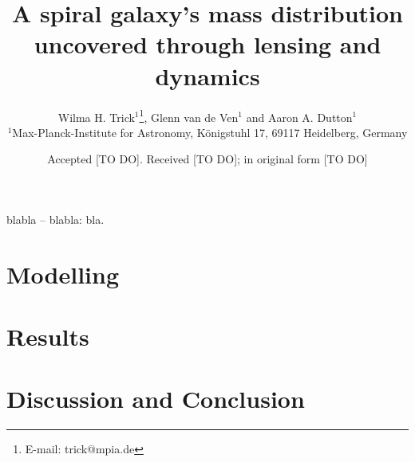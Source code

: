 \documentclass[useAMS,usenatbib]{mn2e}
\title[A spiral galaxy's mass distribution uncovered]{A spiral galaxy's mass distribution uncovered through lensing and dynamics}
\author[W. H. Trick, G. van de Ven and A. A. Dutton]{Wilma H. Trick$^{1}$\thanks{E-mail:
trick@mpia.de}, Glenn van de Ven$^{1}$ and Aaron A. Dutton$^{1}$\\
$^{1}$Max-Planck-Institute for Astronomy, K\"{o}nigstuhl 17, 69117 Heidelberg, Germany}
\begin{document}
\date{Accepted [TO DO]. Received [TO DO]; in original form [TO DO]}

\pagerange{\pageref{firstpage}--\pageref{lastpage}} 

\maketitle

\label{firstpage}

\begin{abstract}

\end{abstract}

\begin{keywords}
blabla -- blabla: bla.
\end{keywords}



\section{Modelling} \label{sec:Modelling}






\section{Results} \label{sec:Results}





\section{Discussion and Conclusion} \label{sec:Discussion}







\label{lastpage}
\end{document}

